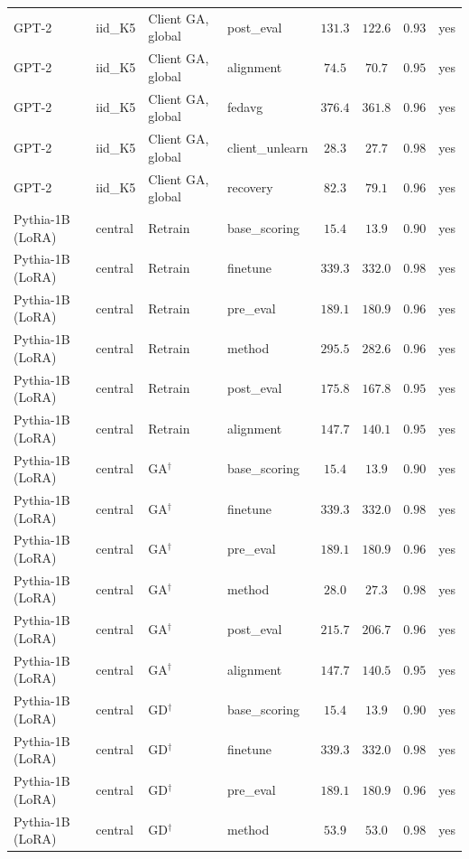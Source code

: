 \begin{table}[t]
\begin{tabular*}{\textwidth}{@{\extracolsep{\fill}}llllcccc@{}}
GPT-2 & iid\_K5 & Client GA, global & post\_eval & $131.3$ & $122.6$ & $0.93$ & yes \\
GPT-2 & iid\_K5 & Client GA, global & alignment & $74.5$ & $70.7$ & $0.95$ & yes \\
GPT-2 & iid\_K5 & Client GA, global & fedavg & $376.4$ & $361.8$ & $0.96$ & yes \\
GPT-2 & iid\_K5 & Client GA, global & client\_unlearn & $28.3$ & $27.7$ & $0.98$ & yes \\
GPT-2 & iid\_K5 & Client GA, global & recovery & $82.3$ & $79.1$ & $0.96$ & yes \\
Pythia-1B (LoRA) & central & Retrain & base\_scoring & $15.4$ & $13.9$ & $0.90$ & yes \\
Pythia-1B (LoRA) & central & Retrain & finetune & $339.3$ & $332.0$ & $0.98$ & yes \\
Pythia-1B (LoRA) & central & Retrain & pre\_eval & $189.1$ & $180.9$ & $0.96$ & yes \\
Pythia-1B (LoRA) & central & Retrain & method & $295.5$ & $282.6$ & $0.96$ & yes \\
Pythia-1B (LoRA) & central & Retrain & post\_eval & $175.8$ & $167.8$ & $0.95$ & yes \\
Pythia-1B (LoRA) & central & Retrain & alignment & $147.7$ & $140.1$ & $0.95$ & yes \\
Pythia-1B (LoRA) & central & GA$^{\dagger}$ & base\_scoring & $15.4$ & $13.9$ & $0.90$ & yes \\
Pythia-1B (LoRA) & central & GA$^{\dagger}$ & finetune & $339.3$ & $332.0$ & $0.98$ & yes \\
Pythia-1B (LoRA) & central & GA$^{\dagger}$ & pre\_eval & $189.1$ & $180.9$ & $0.96$ & yes \\
Pythia-1B (LoRA) & central & GA$^{\dagger}$ & method & $28.0$ & $27.3$ & $0.98$ & yes \\
Pythia-1B (LoRA) & central & GA$^{\dagger}$ & post\_eval & $215.7$ & $206.7$ & $0.96$ & yes \\
Pythia-1B (LoRA) & central & GA$^{\dagger}$ & alignment & $147.7$ & $140.5$ & $0.95$ & yes \\
Pythia-1B (LoRA) & central & GD$^{\dagger}$ & base\_scoring & $15.4$ & $13.9$ & $0.90$ & yes \\
Pythia-1B (LoRA) & central & GD$^{\dagger}$ & finetune & $339.3$ & $332.0$ & $0.98$ & yes \\
Pythia-1B (LoRA) & central & GD$^{\dagger}$ & pre\_eval & $189.1$ & $180.9$ & $0.96$ & yes \\
Pythia-1B (LoRA) & central & GD$^{\dagger}$ & method & $53.9$ & $53.0$ & $0.98$ & yes \\

\end{tabular*}
\end{table}
